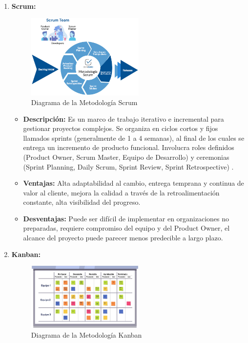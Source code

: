 \begin{enumerate}

    \item \textbf{Scrum:}

    \begin{figure}[H]
        \begin{center}
            \includegraphics[width = 0.55\textwidth]{Figuras/metodologiascrum.png}
        \end{center}
        \caption{\label{fig:metodologiascrum} Diagrama de la Metodología Scrum}
    \end{figure}
    
    \begin{itemize}
        \item \textbf{Descripción:} Es un marco de trabajo iterativo e incremental para gestionar proyectos complejos. Se organiza en ciclos cortos y fijos llamados sprints (generalmente de 1 a 4 semanas), al final de los cuales se entrega un incremento de producto funcional. Involucra roles definidos (Product Owner, Scrum Master, Equipo de Desarrollo) y ceremonias (Sprint Planning, Daily Scrum, Sprint Review, Sprint Retrospective) \cite{studocu2024agiles} \cite{lasa2021agiles}.
        \item \textbf{Ventajas:} Alta adaptabilidad al cambio, entrega temprana y continua de valor al cliente, mejora la calidad a través de la retroalimentación constante, alta visibilidad del progreso.
        \item \textbf{Desventajas:} Puede ser difícil de implementar en organizaciones no preparadas, requiere compromiso del equipo y del Product Owner, el alcance del proyecto puede parecer menos predecible a largo plazo.
    \end{itemize}

    \item \textbf{Kanban:}

    \begin{figure}[H]
        \begin{center}
            \includegraphics[width = 0.55\textwidth]{Figuras/metodologiakanban.png}
        \end{center}
        \caption{\label{fig:metodologiakanban} Diagrama de la Metodología Kanban}
    \end{figure}
    

\end{enumerate}
